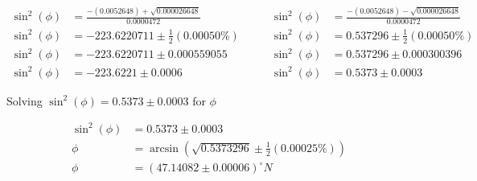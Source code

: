 \documentclass[12pt]{article}
\begin{document}
\begin{equation*}
    \begin{split}
        \sin ^2(\phi)&=\frac{-(0.0052648) + \sqrt{0.000026648}}{0.0000472}\\
        \sin ^2(\phi)&=-223.6220711\pm \frac{1}{2}(0.00050 \%)\\
        \sin ^2(\phi)&=-223.6220711\pm 0.000559055 \\
        \sin ^2(\phi)&=-223.6221\pm 0.0006 
    \end{split}
    \qquad
    \begin{split}
        \sin ^2(\phi)&=\frac{-(0.0052648) - \sqrt{0.000026648}}{0.0000472}\\
        \sin ^2(\phi)&=0.537296\pm \frac{1}{2}(0.00050 \%)\\
        \sin ^2(\phi)&=0.537296\pm 0.000300396\\
        \sin ^2(\phi)&=0.5373\pm 0.0003 
    \end{split}
\end{equation*}


Solving $\sin ^2(\phi)=0.5373\pm 0.0003$ for $\phi$ 

\begin{align*}
        \sin ^2(\phi)&=0.5373\pm 0.0003\\
    \phi&=\arcsin (\sqrt{0.5373296} \pm \frac{1}{2}(0.00025\%))\\
    \phi&=(47.14082 \pm 0.00006)^\circ N
\end{align*}
\end{document}
